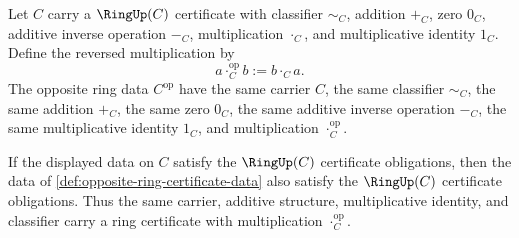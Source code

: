 \begin{definition}
\label{def:opposite-ring-certificate-data}
Let $C$ carry a $\RingUp(C)$ certificate with classifier $\sim_C$, addition
$+_C$, zero $0_C$, additive inverse operation $-_C$, multiplication $\cdot_C$,
and multiplicative identity $1_C$. Define the reversed multiplication by
$$
a\cdot_C^{\mathrm{op}} b:=b\cdot_C a.
$$
The opposite ring data $C^{\mathrm{op}}$ have the same carrier $C$, the same
classifier $\sim_C$, the same addition $+_C$, the same zero $0_C$, the same
additive inverse operation $-_C$, the same multiplicative identity $1_C$, and
multiplication $\cdot_C^{\mathrm{op}}$.
\end{definition}

\begin{theorem}
\label{thm:opposite-ring-certificate}
If the displayed data on $C$ satisfy the $\RingUp(C)$ certificate obligations,
then the data of \autoref{def:opposite-ring-certificate-data} also satisfy the
$\RingUp(C)$ certificate obligations. Thus the same carrier, additive
structure, multiplicative identity, and classifier carry a ring certificate with
multiplication $\cdot_C^{\mathrm{op}}$.
\end{theorem}
